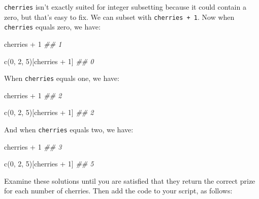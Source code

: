 \documentclass[
  letterpaper,
  DIV=11,
  numbers=noendperiod]{scrbook}
\newenvironment{Shaded}{\begin{snugshade}}{\end{snugshade}}
\newcommand{\DecValTok}[1]{\textcolor[rgb]{0.68,0.00,0.00}{#1}}
\newcommand{\DocumentationTok}[1]{\textcolor[rgb]{0.37,0.37,0.37}{\textit{#1}}}
\newcommand{\FunctionTok}[1]{\textcolor[rgb]{0.28,0.35,0.67}{#1}}
\newcommand{\NormalTok}[1]{\textcolor[rgb]{0.00,0.23,0.31}{#1}}
\newcommand{\SpecialCharTok}[1]{\textcolor[rgb]{0.37,0.37,0.37}{#1}}
\begin{document}
\texttt{cherries} isn't exactly suited for integer subsetting because it
could contain a zero, but that's easy to fix. We can subset with
\texttt{cherries\ +\ 1}. Now when \texttt{cherries} equals zero, we
have:

\begin{Shaded}
\begin{Highlighting}[]
\NormalTok{cherries }\SpecialCharTok{+} \DecValTok{1}
\DocumentationTok{\#\# 1}

\FunctionTok{c}\NormalTok{(}\DecValTok{0}\NormalTok{, }\DecValTok{2}\NormalTok{, }\DecValTok{5}\NormalTok{)[cherries }\SpecialCharTok{+} \DecValTok{1}\NormalTok{]}
\DocumentationTok{\#\# 0}
\end{Highlighting}
\end{Shaded}

When \texttt{cherries} equals one, we have:

\begin{Shaded}
\begin{Highlighting}[]
\NormalTok{cherries }\SpecialCharTok{+} \DecValTok{1}
\DocumentationTok{\#\# 2}

\FunctionTok{c}\NormalTok{(}\DecValTok{0}\NormalTok{, }\DecValTok{2}\NormalTok{, }\DecValTok{5}\NormalTok{)[cherries }\SpecialCharTok{+} \DecValTok{1}\NormalTok{]}
\DocumentationTok{\#\# 2}
\end{Highlighting}
\end{Shaded}

And when \texttt{cherries} equals two, we have:

\begin{Shaded}
\begin{Highlighting}[]
\NormalTok{cherries }\SpecialCharTok{+} \DecValTok{1}
\DocumentationTok{\#\# 3}

\FunctionTok{c}\NormalTok{(}\DecValTok{0}\NormalTok{, }\DecValTok{2}\NormalTok{, }\DecValTok{5}\NormalTok{)[cherries }\SpecialCharTok{+} \DecValTok{1}\NormalTok{]}
\DocumentationTok{\#\# 5}
\end{Highlighting}
\end{Shaded}

Examine these solutions until you are satisfied that they return the
correct prize for each number of cherries. Then add the code to your
script, as follows:
\end{document}
